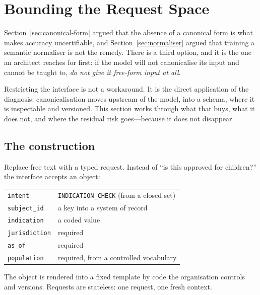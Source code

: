 \documentclass[11pt]{article}
\theoremstyle{plain}
\theoremstyle{definition}
\begin{document}
\section{Bounding the Request Space}
\label{sec:bounded}

Section~\ref{sec:canonical-form} argued that the absence of a canonical form is what
makes accuracy uncertifiable, and Section~\ref{sec:normaliser} argued that training a
semantic normaliser is not the remedy. There is a third option, and it is the one an
architect reaches for first: if the model will not canonicalise its input and cannot
be taught to, \emph{do not give it free-form input at all}.

Restricting the interface is not a workaround. It is the direct application of the
diagnosis: canonicalisation moves upstream of the model, into a schema, where it is
inspectable and versioned. This section works through what that buys, what it does
not, and where the residual risk goes---because it does not disappear.

\subsection{The construction}

Replace free text with a typed request. Instead of ``is this approved for children?''
the interface accepts an object:

\begin{center}
\small
\begin{tabular}{@{}l>{\raggedright\arraybackslash}p{7.2cm}@{}}
\toprule
\texttt{intent} & \texttt{INDICATION\_CHECK} (from a closed set) \\
\texttt{subject\_id} & a key into a system of record \\
\texttt{indication} & a coded value \\
\texttt{jurisdiction} & required \\
\texttt{as\_of} & required \\
\texttt{population} & required, from a controlled vocabulary \\
\bottomrule
\end{tabular}
\end{center}

The object is rendered into a fixed template by code the organisation controls and
versions. Requests are stateless: one request, one fresh context.
\end{document}
